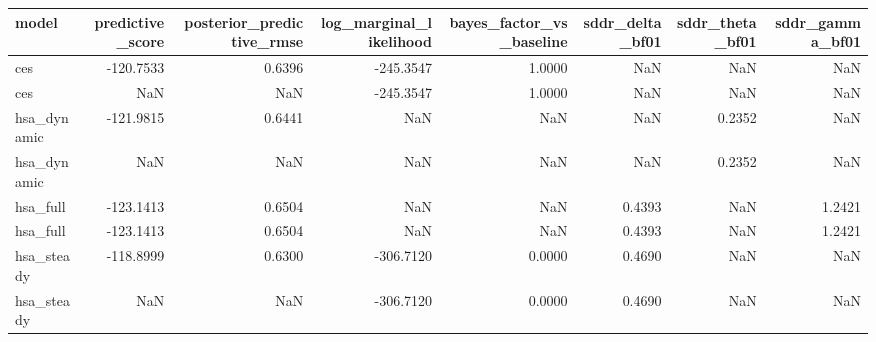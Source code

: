 \begin{tabular}{lrrrrrrr}
\toprule
model & predictive\_score & posterior\_predictive\_rmse & log\_marginal\_likelihood & bayes\_factor\_vs\_baseline & sddr\_delta\_bf01 & sddr\_theta\_bf01 & sddr\_gamma\_bf01 \\
\midrule
ces & -120.7533 & 0.6396 & -245.3547 & 1.0000 & NaN & NaN & NaN \\
ces & NaN & NaN & -245.3547 & 1.0000 & NaN & NaN & NaN \\
hsa\_dynamic & -121.9815 & 0.6441 & NaN & NaN & NaN & 0.2352 & NaN \\
hsa\_dynamic & NaN & NaN & NaN & NaN & NaN & 0.2352 & NaN \\
hsa\_full & -123.1413 & 0.6504 & NaN & NaN & 0.4393 & NaN & 1.2421 \\
hsa\_full & -123.1413 & 0.6504 & NaN & NaN & 0.4393 & NaN & 1.2421 \\
hsa\_steady & -118.8999 & 0.6300 & -306.7120 & 0.0000 & 0.4690 & NaN & NaN \\
hsa\_steady & NaN & NaN & -306.7120 & 0.0000 & 0.4690 & NaN & NaN \\
\bottomrule
\end{tabular}
